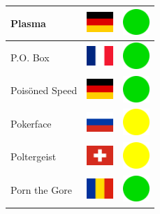 \documentclass[12pt, a4paper, twoside]{report}
\begin{document}
\begin{center}
\begin{longtable}{|p{5cm}|p{2cm}|p{2cm}|}
 Plasma                                                     & \includegraphics[width=1cm]{../4x3/de} &   \includegraphics[width=1cm]{../likes/y} \\ \hline
 P.O. Box                                                   & \includegraphics[width=1cm]{../4x3/fr} &   \includegraphics[width=1cm]{../likes/y} \\ \hline
 Poisöned Speed                                             & \includegraphics[width=1cm]{../4x3/de} &   \includegraphics[width=1cm]{../likes/y} \\ \hline
 Pokerface                                                  & \includegraphics[width=1cm]{../4x3/ru} &   \includegraphics[width=1cm]{../likes/m} \\ \hline
 Poltergeist                                                & \includegraphics[width=1cm]{../4x3/ch} &   \includegraphics[width=1cm]{../likes/m} \\ \hline
 Porn the Gore                                              & \includegraphics[width=1cm]{../4x3/ro} &   \includegraphics[width=1cm]{../likes/y} \\ \hline

\end{longtable}
\end{center}
\end{document}
